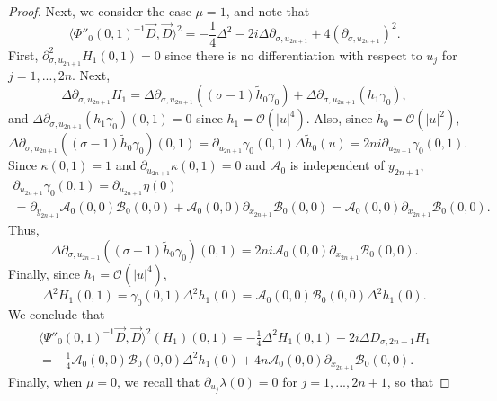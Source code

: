 \documentclass{article}
\newcommand{\mca}{\mathcal A}
\newcommand{\mcb}{\mathcal B}
\newcommand{\mco}{\mathcal O}
\begin{document}
\begin{proof}
Next, we consider the case $\mu = 1$, and note that
\begin{equation*} \langle \Phi''_0(0,1)^{-1} \vec D, \vec D \rangle^2 = -\frac 1 4 \Delta^2 -2 i \Delta \partial_{\sigma, u_{2n+1}} + 4 (\partial_{\sigma, u_{2n+1}})^2.\end{equation*}
%
First, $\partial_{\sigma, u_{2n+1}}^2 H_{1}(0,1) = 0$ since there is no differentiation with respect to $u_j$ for $j = 1,...,2n$. Next,
\begin{equation*} \Delta \partial_{\sigma, u_{2n+1}} H_{1} = \Delta \partial_{\sigma, u_{2n+1}}\left((\sigma-1) \tilde h_0 \gamma_0\right) + \Delta \partial_{\sigma, u_{2n+1}} \left(h_1 \gamma_0\right),\end{equation*}
and $\Delta \partial_{\sigma, u_{2n+1}} \left(h_1 \gamma_0 \right)(0,1) = 0$ since $h_1 = \mco(|u|^4)$. Also, since $\tilde h_0 = \mco(|u|^2)$,
\begin{equation*} \Delta \partial_{\sigma, u_{2n+1}}\left((\sigma-1) \tilde h_0 \gamma_0 \right)(0,1) = \partial_{u_{2n+1}}\gamma_0(0,1) \Delta \tilde h_0(u) = 2ni \partial_{u_{2n+1}}\gamma_0(0,1).\end{equation*}
Since $\kappa(0,1) = 1$ and $\partial_{u_{2n+1}} \kappa(0,1) = 0$ and $\mca_0$ is independent of $y_{2n+1}$,
\begin{multline*} \partial_{u_{2n+1}} \gamma_0(0,1) = \partial_{u_{2n+1}} \eta(0)\\ = \partial_{y_{2n+1}} \mca_0(0,0) \mcb_0(0,0) + \mca_0(0,0) \partial_{x_{2n+1}}\mcb_0(0,0) = \mca_0(0,0) \partial_{x_{2n+1}}\mcb_0(0,0).\end{multline*}
Thus,
\begin{equation*} \Delta \partial_{\sigma, u_{2n+1}} \left((\sigma-1) \tilde h_0 \gamma_0 \right)(0,1) = 2ni  \mca_0(0,0)\partial_{x_{2n+1}}\mcb_0(0,0).\end{equation*}
%
Finally, since $h_1 = \mco(|u|^4)$,
\begin{equation*} \Delta^2 H_{1}(0,1) = \gamma_0(0,1) \Delta^2 h_1(0) = \mca_0(0,0) \mcb_0(0,0) \Delta^2 h_1(0).\end{equation*}
%
We conclude that
\begin{multline*} \langle \Psi''_0(0,1)^{-1} \vec D, \vec D \rangle^2(H_{1})(0,1) =-\frac 1 4 \Delta^2 H_{1}(0,1) - 2 i \Delta D_{\sigma,2n+1} H_{1}\\ = -\frac 1 4 \mca_0(0,0) \mcb_0(0,0) \Delta^2 h_1(0) +4n \mca_0(0,0)\partial_{x_{2n+1}}\mcb_0(0,0).\end{multline*}
%
Finally, when $\mu = 0$, we recall that $\partial_{u_j} \lambda(0) = 0$ for $j = 1,...,2n+1$, so that

\end{proof}
\end{document}
